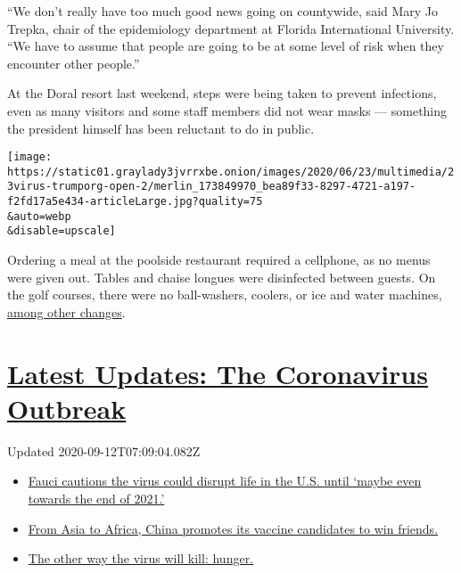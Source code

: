 ``We don't really have too much good news going on countywide, said Mary
Jo Trepka, chair of the epidemiology department at Florida International
University. ``We have to assume that people are going to be at some
level of risk when they encounter other people.''

At the Doral resort last weekend, steps were being taken to prevent
infections, even as many visitors and some staff members did not wear
masks --- something the president himself has been reluctant to do in
public.

\texttt{[image: https://static01.graylady3jvrrxbe.onion/images/2020/06/23/multimedia/23virus-trumporg-open-2/merlin\_173849970\_bea89f33-8297-4721-a197-f2fd17a5e434-articleLarge.jpg?quality=75\\\&auto=webp\\\&disable=upscale]}

Ordering a meal at the poolside restaurant required a cellphone, as no
menus were given out. Tables and chaise longues were disinfected between
guests. On the golf courses, there were no ball-washers, coolers, or ice
and water machines,
\href{https://www.trumphotels.com/miami/golf/procedures}{among other
changes}.

\hypertarget{latest-updates-the-coronavirus-outbreak}{%
\section{\texorpdfstring{\href{https://www.nytimes3xbfgragh.onion/2020/09/11/world/covid-19-coronavirus.html?action=click\&pgtype=Article\&state=default\&region=MAIN_CONTENT_1\&context=storylines_live_updates}{Latest
Updates: The Coronavirus
Outbreak}}{Latest Updates: The Coronavirus Outbreak}}\label{latest-updates-the-coronavirus-outbreak}}

Updated 2020-09-12T07:09:04.082Z

\begin{itemize}
\tightlist
\item
  \href{https://www.nytimes3xbfgragh.onion/2020/09/11/world/covid-19-coronavirus.html?action=click\&pgtype=Article\&state=default\&region=MAIN_CONTENT_1\&context=storylines_live_updates\#link-dfb8a16}{Fauci
  cautions the virus could disrupt life in the U.S. until `maybe even
  towards the end of 2021.'}
\item
  \href{https://www.nytimes3xbfgragh.onion/2020/09/11/world/covid-19-coronavirus.html?action=click\&pgtype=Article\&state=default\&region=MAIN_CONTENT_1\&context=storylines_live_updates\#link-7104d154}{From
  Asia to Africa, China promotes its vaccine candidates to win friends.}
\item
  \href{https://www.nytimes3xbfgragh.onion/2020/09/11/world/covid-19-coronavirus.html?action=click\&pgtype=Article\&state=default\&region=MAIN_CONTENT_1\&context=storylines_live_updates\#link-393ad215}{The
  other way the virus will kill: hunger.}
\end{itemize}

